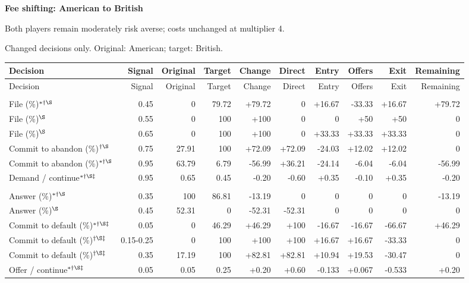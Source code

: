 \documentclass[10pt]{article}
\begin{document}
{\large\bfseries Fee shifting: American to British}\par
Both players remain moderately risk averse; costs unchanged at multiplier 4.\par
{\small Changed decisions only. Original: American; target: British.}\par
{\small\setlength{\tabcolsep}{3pt}\begin{longtable}{@{}>{\raggedright\arraybackslash}p{1.65in}rrrrrrrrr@{}}
\toprule Decision & Signal & Original & Target & Change & Direct & Entry & Offers & Exit & Remaining \\\midrule\endfirsthead
\toprule Decision & Signal & Original & Target & Change & Direct & Entry & Offers & Exit & Remaining \\\midrule\endhead
\bottomrule\endfoot
\multicolumn{10}{@{}l}{\textbf{Plaintiff}}\\
File (\%)$^{*\dagger\S}$ & 0.45 & 0 & 79.72 & +79.72 & 0 & +16.67 & -33.33 & +16.67 & +79.72\\
File (\%)$^{\S}$ & 0.55 & 0 & 100 & +100 & 0 & 0 & +50 & +50 & 0\\
File (\%)$^{\S}$ & 0.65 & 0 & 100 & +100 & 0 & +33.33 & +33.33 & +33.33 & 0\\
Commit to abandon (\%)$^{\dagger\S}$ & 0.75 & 27.91 & 100 & +72.09 & +72.09 & -24.03 & +12.02 & +12.02 & 0\\
Commit to abandon (\%)$^{*\dagger\S}$ & 0.95 & 63.79 & 6.79 & -56.99 & +36.21 & -24.14 & -6.04 & -6.04 & -56.99\\
Demand / continue$^{*\dagger\S\ddagger}$ & 0.95 & 0.65 & 0.45 & -0.20 & -0.60 & +0.35 & -0.10 & +0.35 & -0.20\\
\multicolumn{10}{@{}l}{\textbf{Defendant}}\\
Answer (\%)$^{*\dagger\S}$ & 0.35 & 100 & 86.81 & -13.19 & 0 & 0 & 0 & 0 & -13.19\\
Answer (\%)$^{\S}$ & 0.45 & 52.31 & 0 & -52.31 & -52.31 & 0 & 0 & 0 & 0\\
Commit to default (\%)$^{*\dagger\S\ddagger}$ & 0.05 & 0 & 46.29 & +46.29 & +100 & -16.67 & -16.67 & -66.67 & +46.29\\
Commit to default (\%)$^{\dagger\S\ddagger}$ & 0.15-0.25 & 0 & 100 & +100 & +100 & +16.67 & +16.67 & -33.33 & 0\\
Commit to default (\%)$^{\dagger\S\ddagger}$ & 0.35 & 17.19 & 100 & +82.81 & +82.81 & +10.94 & +19.53 & -30.47 & 0\\
Offer / continue$^{*\dagger\S\ddagger}$ & 0.05 & 0.05 & 0.25 & +0.20 & +0.60 & -0.133 & +0.067 & -0.533 & +0.20\\
\end{longtable}}
\end{document}
